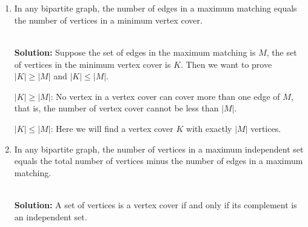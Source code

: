 \section{}
\begin{enumerate}
\item In any bipartite graph, the number of edges in a maximum matching equals the number of vertices in a minimum vertex cover.

\ \\{\bf Solution:} Suppose the set of edges in the maximum matching is $M$, the set of vertices in the minimum vertex cover is $K$. Then we want to prove $|K|\ge |M|$ and $|K|\le |M|$.

$|K|\ge|M|$: No vertex in a vertex cover can cover more than one edge of $M$, that is, the number of vertex cover cannot be less than $|M|$. 

$|K|\le|M|$: Here we will find a vertex cover $K$ with exactly $|M|$ vertices. 

\item In any bipartite graph, the number of vertices in a maximum independent set equals the total number of vertices minus the number of edges in a maximum matching.

\ \\{\bf Solution:} A set of vertices is a vertex cover if and only if its complement is an independent set.
\end{enumerate}